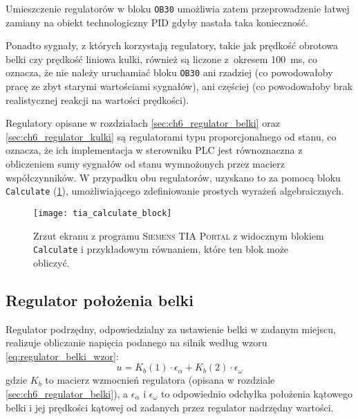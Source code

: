 Umieszczenie regulatorów w bloku \texttt{OB30} umożliwia zatem przeprowadzenie łatwej zamiany na obiekt technologiczny PID gdyby nastała taka konieczność.

Ponadto sygnały, z których korzystają regulatory, takie jak prędkość obrotowa belki czy prędkość liniowa kulki, również są liczone z~okresem \SI{100}{\milli\second}, co oznacza, że nie należy uruchamiać bloku \texttt{OB30} ani rzadziej (co powodowałoby pracę ze zbyt starymi wartościami sygnałów), ani częściej (co powodowałoby brak realistycznej reakcji na wartości prędkości).

Regulatory opisane w rozdziałach \ref{sec:ch6_regulator_belki} oraz \ref{sec:ch6_regulator_kulki} są regulatorami typu proporcjonalnego od stanu, co oznacza, że ich implementacja w sterowniku PLC jest równoznaczna z obliczeniem sumy sygnałów od stanu wymnożonych przez macierz współczynników. W przypadku obu regulatorów, uzyskano to za pomocą bloku \texttt{Calculate} (\cref{fig:tia_portal_blok_calculate}), umożliwiającego zdefiniowanie prostych wyrażeń algebraicznych.

\begin{figure}[h]
    \centering
    \texttt{[image: tia\_calculate\_block]}
    \caption{Zrzut ekranu z programu \textsc{Siemens TIA Portal} z widocznym blokiem \texttt{Calculate} i przykładowym równaniem, które ten blok może obliczyć.}
    \label{fig:tia_portal_blok_calculate}
\end{figure}


\subsection{Regulator położenia belki}
\label{subsec:ch7_regulator_belki}

Regulator podrzędny, odpowiedzialny za ustawienie belki w zadanym miejscu, realizuje obliczanie napięcia podanego na silnik według wzoru \eqref{eq:regulator_belki_wzor}:
\begin{equation}
    u = K_b(1) \cdot \epsilon_\alpha + K_b(2) \cdot \epsilon_\omega
    \label{eq:regulator_belki_wzor}
\end{equation}
gdzie $K_b$ to macierz wzmocnień regulatora (opisana w rozdziale \ref{sec:ch6_regulator_belki}), a $\epsilon_\alpha$ i $\epsilon_\omega$ to odpowiednio odchyłka położenia kątowego belki i jej prędkości kątowej od zadanych przez regulator nadrzędny wartości.

